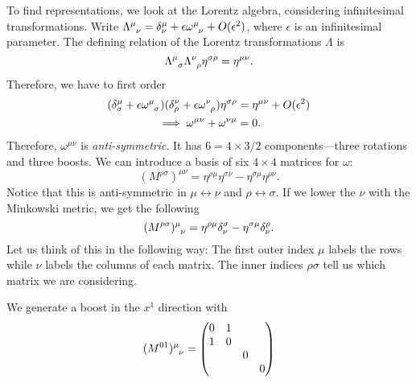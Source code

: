 To find representations, we look at the Lorentz algebra, considering infinitesimal transformations.
Write $\Lambda \indices{^{\mu}_{\nu}} = \delta^{\mu}_{\nu} + \epsilon \omega \indices{^{\mu}_{\nu}} + O(\epsilon^2)$, where $\epsilon$ is an infinitesimal parameter.
The defining relation of the Lorentz transformations $\Lambda$ is
\begin{equation}
  \Lambda \indices{^{\mu}_{\sigma}} \Lambda \indices{^{\nu}_{\rho}} \eta^{\sigma\rho} = \eta^{\mu\nu}.
\end{equation}
Therefore, we have to first order
\begin{align}
  (\delta^{\mu}_{\sigma} + \epsilon \omega \indices{^{\mu}_{\sigma}}) (\delta^{\nu}_{\rho} + \epsilon \omega \indices{^{\nu}_{\rho}}) \eta^{\sigma\rho} &= \eta^{\mu\nu} + O(\epsilon^2) \\
															  \implies \omega^{\mu\nu} + \omega^{\nu\mu} &= 0.
\end{align}
Therefore, $\omega^{\mu\nu}$ is \emph{anti-symmetric}.
It has $6 = 4 \times 3 / 2$ components---three rotations and three boosts.
We can introduce a basis of six $4 \times 4$ matrices for $\omega$:
\begin{equation}
  (M^{\rho\sigma})^{\mu\nu} = \eta^{\rho\mu} \eta^{\sigma\nu} - \eta^{\sigma\mu} \eta^{\rho\nu}.
\end{equation}
Notice that this is anti-symmetric in $\mu \leftrightarrow \nu$ and $\rho \leftrightarrow \sigma$.
If we lower the $\nu$ with the Minkowski metric, we get the following
\begin{equation}
  \label{eq:13-lorentz-generators}
  (M^{\rho\sigma}) \indices{^{\mu}_{\nu}} = \eta^{\rho\mu} \delta^{\sigma}_{\nu} - \eta^{\sigma\mu} \delta^{\rho}_{\nu}.
\end{equation}
Let us think of this in the following way: The first outer index $\mu$ labels the rows while $\nu$ labels the columns of each matrix. The inner indices $\rho\sigma$ tell us which matrix we are considering.
\begin{example}[]
  We generate a boost in the $x^1$ direction with
  \begin{equation}
    (M^{01}) \indices{^{\mu}_{\nu}} = 
    \begin{pmatrix}
     0 & 1 &  &  \\
     1 & 0 &  &  \\
      &  & 0 &  \\
      &  &  & 0 \\
    \end{pmatrix}
  \end{equation}
\end{example}
